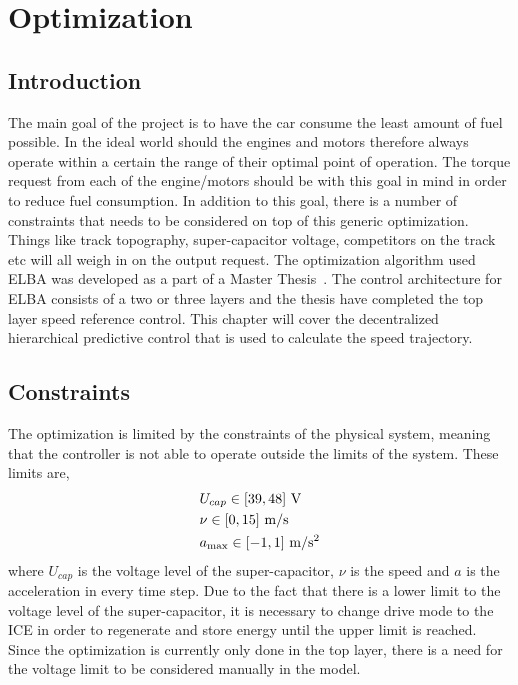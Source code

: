 \chapter{Optimization}
\section{Introduction}
The main goal of the project is to have the car consume the least amount of fuel
possible. In the ideal world should the engines and motors therefore always operate
within a certain the range of their optimal point of operation. The torque request
from each of the engine/motors should be with this goal in mind in order to reduce
fuel consumption. In addition to this goal, there is a number of constraints that
needs to be considered on top of this generic optimization.  Things like track
topography, super-capacitor voltage, competitors on the track etc will all weigh in
on the output request. The optimization algorithm used ELBA was developed as a part
of a Master Thesis~\cite{liu2016}. The control architecture for ELBA consists of a
two or three layers and the thesis have completed the top layer speed reference
control. This chapter will cover the decentralized hierarchical predictive control
that is used to calculate the speed trajectory.

\section{Constraints}
The optimization is limited by the constraints of the physical system, meaning that
the controller is not able to operate outside the limits of the system. These limits
are,
\begin{align}
    &U_{cap} \in [39,48]~\textup{V} \\
    &\nu \in [0,15]~\textup{m/s}\\
    &a_{\max} \in [-1,1]~\textup{m/s$^2$}
\end{align}
where $U_{cap}$ is the voltage level of the super-capacitor, $\nu$ is the speed and
$a$ is the acceleration in every time step. Due to the fact that there is a lower
limit to the voltage level of the super-capacitor, it is necessary to change drive
mode to the ICE in order to regenerate and store energy until the upper limit is
reached. Since the optimization is currently only done in the top layer, there
is a need for the voltage limit to be considered manually in the model.

